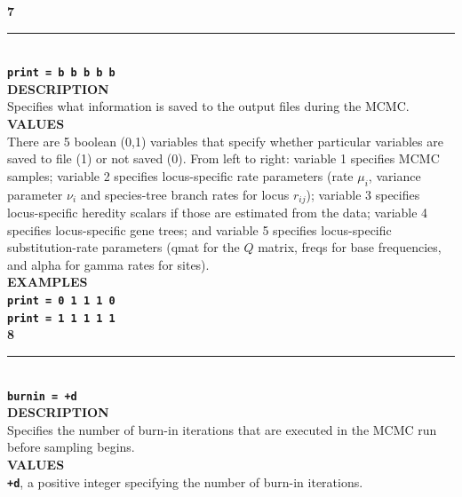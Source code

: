 \documentclass[a4paper]{book}
\numberwithin{equation}{section} \renewcommand{\baselinestretch}{0.55}
\begin{document}
\textbf{{\large 7}} \\
\noindent\rule{\textwidth}{0.8pt} \\
\textbf{{\Large \texttt{print = b b b b b}}} \vspace{5pt}\\
\textbf{DESCRIPTION} \vspace{5pt}\\
Specifies what information is saved to the output files during the
MCMC.
\vspace{5pt}\\
\textbf{VALUES} \vspace{5pt}\\
There are 5 boolean (0,1) variables that specify whether particular
variables are saved to file (1) or not saved (0). From left to right:
variable 1 specifies MCMC samples; variable 2 specifies locus-specific
rate parameters (rate $\mu_i$, variance parameter $\nu_i$ and
species-tree branch rates for locus $r_{ij}$); variable 3 specifies
locus-specific heredity scalars if those are estimated from the data;
variable 4 specifies locus-specific gene trees; and variable 5
specifies locus-specific substitution-rate parameters (qmat for the
$Q$ matrix, freqs for base
frequencies, and alpha for gamma rates for sites).  \vspace{5pt}\\
\textbf{EXAMPLES} \vspace{5pt}\\
\textbf{\texttt{print = 0 1 1 1 0}} \vspace{5pt}\\
\textbf{\texttt{print = 1 1 1 1 1}} \vspace{10pt}\\
\textbf{{\large 8}} \\
\noindent\rule{\textwidth}{0.8pt} \\
\textbf{{\Large \texttt{burnin = +d}}} \vspace{5pt}\\
\textbf{DESCRIPTION} \vspace{5pt}\\
Specifies the number of burn-in iterations that are executed in the
MCMC run before sampling begins.
\vspace{5pt}\\
\textbf{VALUES} \vspace{5pt}\\
\textbf{\texttt{+d}}, a positive integer specifying the number of burn-in iterations. \vspace{5pt}\\
\end{document}

